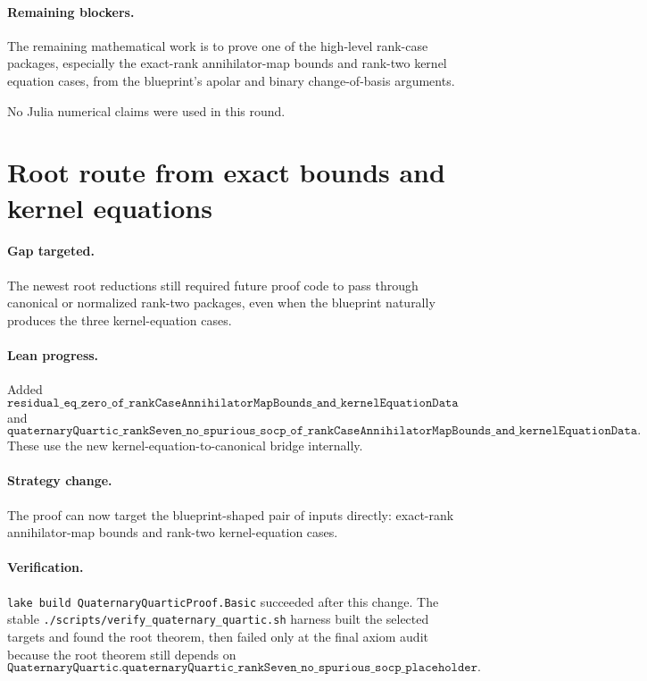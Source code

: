 \documentclass[11pt]{article}
\begin{document}
\paragraph{Remaining blockers.}
The remaining mathematical work is to prove one of the high-level rank-case
packages, especially the exact-rank annihilator-map bounds and rank-two kernel
equation cases, from the blueprint's apolar and binary change-of-basis
arguments.

No Julia numerical claims were used in this round.

\section*{Root route from exact bounds and kernel equations}

\paragraph{Gap targeted.}
The newest root reductions still required future proof code to pass through
canonical or normalized rank-two packages, even when the blueprint naturally
produces the three kernel-equation cases.

\paragraph{Lean progress.}
Added
\[
\texttt{residual\_eq\_zero\_of\_rankCaseAnnihilatorMapBounds\_and\_kernelEquationData}
\]
and
\[
\texttt{quaternaryQuartic\_rankSeven\_no\_spurious\_socp\_of\_rankCaseAnnihilatorMapBounds\_and\_kernelEquationData}.
\]
These use the new kernel-equation-to-canonical bridge internally.

\paragraph{Strategy change.}
The proof can now target the blueprint-shaped pair of inputs directly:
exact-rank annihilator-map bounds and rank-two kernel-equation cases.

\paragraph{Verification.}
\texttt{lake build QuaternaryQuarticProof.Basic} succeeded after this change.
The stable \texttt{./scripts/verify\_quaternary\_quartic.sh} harness built the
selected targets and found the root theorem, then failed only at the final axiom
audit because the root theorem still depends on
\[
\texttt{QuaternaryQuartic.quaternaryQuartic\_rankSeven\_no\_spurious\_socp\_placeholder}.
\]
\end{document}
